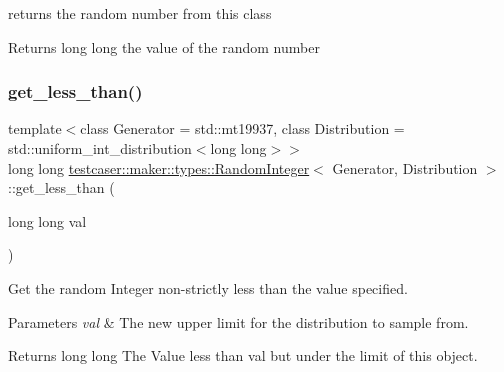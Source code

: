 returns the random number from this class 

\begin{DoxyReturn}{Returns}
long long the value of the random number 
\end{DoxyReturn}
\mbox{\label{classtestcaser_1_1maker_1_1types_1_1RandomInteger_afe7ef6baf52d095f5b17ad4f8d9e5f1a}} 
\subsubsection{\texorpdfstring{get\+\_\+less\+\_\+than()}{get\_less\_than()}}
{\footnotesize\ttfamily template$<$class Generator = std\+::mt19937, class Distribution = std\+::uniform\+\_\+int\+\_\+distribution$<$long long$>$$>$ \\
long long \hyperlink{classtestcaser_1_1maker_1_1types_1_1RandomInteger}{testcaser\+::maker\+::types\+::\+Random\+Integer}$<$ Generator, Distribution $>$\+::get\+\_\+less\+\_\+than (\begin{DoxyParamCaption}\item[{long long}]{val }\end{DoxyParamCaption})\hspace{0.3cm}{\ttfamily [inline]}}



Get the random Integer non-\/strictly less than the value specified. 


\begin{DoxyParams}{Parameters}
{\em val} & The new upper limit for the distribution to sample from. \\
\hline
\end{DoxyParams}
\begin{DoxyReturn}{Returns}
long long The Value less than val but under the limit of this object. 
\end{DoxyReturn}
\mbox{\label{classtestcaser_1_1maker_1_1types_1_1RandomInteger_ace51a32acc0f219b70aa00d1cd2604c5}} 
